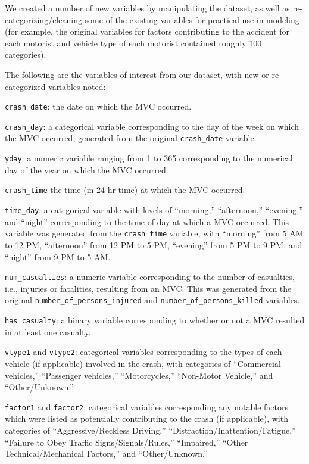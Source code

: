 \documentclass[
  letterpaper,
  DIV=11,
  numbers=noendperiod]{scrartcl}
\begin{document}
We created a number of new variables by manipulating the dataset, as
well as re-categorizing/cleaning some of the existing variables for
practical use in modeling (for example, the original variables for
factors contributing to the accident for each motorist and vehicle type
of each motorist contained roughly 100 categories).

The following are the variables of interest from our dataset, with new
or re-categorized variables noted:

\texttt{crash\_date}: the date on which the MVC occurred.

\texttt{crash\_day}: a categorical variable corresponding to the day of
the week on which the MVC occurred, generated from the original
\texttt{crash\_date} variable.

\texttt{yday}: a numeric variable ranging from 1 to 365 corresponding to
the numerical day of the year on which the MVC occurred.

\texttt{crash\_time} the time (in 24-hr time) at which the MVC occurred.

\texttt{time\_day}: a categorical variable with levels of ``morning,''
``afternoon,'' ``evening,'' and ``night'' corresponding to the time of
day at which a MVC occurred. This variable was generated from the
\texttt{crash\_time} variable, with ``morning'' from 5 AM to 12 PM,
``afternoon'' from 12 PM to 5 PM, ``evening'' from 5 PM to 9 PM, and
``night'' from 9 PM to 5 AM.

\texttt{num\_casualties}: a numeric variable corresponding to the number
of casualties, i.e., injuries or fatalities, resulting from an MVC. This
was generated from the original \texttt{number\_of\_persons\_injured}
and \texttt{number\_of\_persons\_killed} variables.

\texttt{has\_casualty}: a binary variable corresponding to whether or
not a MVC resulted in at least one casualty.

\texttt{vtype1} and \texttt{vtype2}: categorical variables corresponding
to the types of each vehicle (if applicable) involved in the crash, with
categories of ``Commercial vehicles,'' ``Passenger vehicles,''
``Motorcycles,'' ``Non-Motor Vehicle,'' and ``Other/Unknown.''

\texttt{factor1} and \texttt{factor2}: categorical variables
corresponding any notable factors which were listed as potentially
contributing to the crash (if applicable), with categories of
``Aggressive/Reckless Driving,'' ``Distraction/Inattention/Fatigue,''
``Failure to Obey Traffic Signs/Signals/Rules,'' ``Impaired,'' ``Other
Technical/Mechanical Factors,'' and ``Other/Unknown.''
\end{document}
